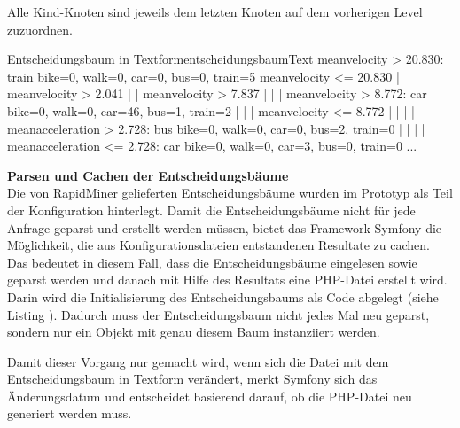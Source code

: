 Alle Kind-Knoten sind jeweils dem letzten Knoten auf dem vorherigen Level zuzuordnen.

\begin{code}[]{Entscheidungsbaum in Textform}{entscheidungsbaumText}
meanvelocity > 20.830: train {bike=0, walk=0, car=0, bus=0, train=5}
meanvelocity <= 20.830
|   meanvelocity > 2.041
|   |   meanvelocity > 7.837
|   |   |   meanvelocity > 8.772: car {bike=0, walk=0, car=46, bus=1, train=2}
|   |   |   meanvelocity <= 8.772
|   |   |   |   meanacceleration > 2.728: bus {bike=0, walk=0, car=0, bus=2, train=0}
|   |   |   |   meanacceleration <= 2.728: car {bike=0, walk=0, car=3, bus=0, train=0}
...
\end{code}

\textbf{Parsen und Cachen der Entscheidungsbäume} \\
\label{parsenCachenEntscheidungsbaum}
Die von RapidMiner gelieferten Entscheidungsbäume wurden im Prototyp als Teil der Konfiguration hinterlegt. Damit die Entscheidungsbäume nicht für jede Anfrage geparst und erstellt werden müssen, bietet das Framework Symfony die Möglichkeit, die aus Konfigurationsdateien entstandenen Resultate zu cachen. Das bedeutet in diesem Fall, dass die Entscheidungsbäume eingelesen sowie geparst werden und danach mit Hilfe des Resultats eine PHP-Datei erstellt wird. Darin wird die Initialisierung des Entscheidungsbaums als Code abgelegt (siehe Listing ). Dadurch muss der Entscheidungsbaum nicht jedes Mal neu geparst, sondern nur ein Objekt mit genau diesem Baum instanziiert werden. 

\begin{code}[PHP]{Ausschnitt des generierten Entscheidungsbaums als PHP-Klasse}{entscheidungsbaumPHP}
...
class BasicDecisionTree implements DecisionTreeInterface
{
    protected $tree;

    function __construct()
    {
        $node0 = new Node();
        $node0->setDecision(new Decision('meanvelocity', '>', 20.83));
        $node1 = new Node();
        $node1->setResult(new Result(0,0,0,0,5));
        ...
        $node0->setRight($node2);
        $node1->setParent($node1);
        $node2->setParent($node0);
        $node2->setLeft($node3);
        ...
\end{code}

Damit dieser Vorgang nur gemacht wird, wenn sich die Datei mit dem Entscheidungsbaum in Textform verändert, merkt Symfony sich das Änderungsdatum und entscheidet basierend darauf, ob die PHP-Datei neu generiert werden muss.

